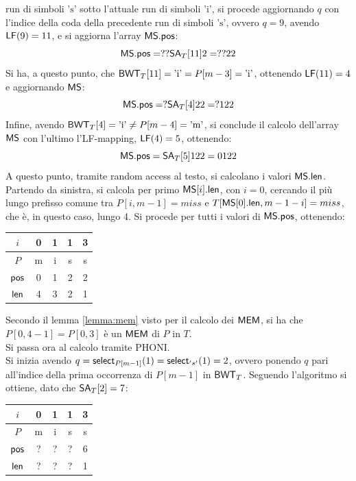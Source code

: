 \begin{esempio}
  run di simboli $\mbox{'s'}$ sotto l'attuale run di simboli $\mbox{'i'}$, si
  procede aggiornando $q$ con l'indice della coda della precedente run di
  simboli $\mbox{'s'}$, ovvero $q=9$, avendo $\mbox{\rm {\sf LF}}(9)=11$, e si aggiorna
  l'array $\mbox{\rm {\sf MS}}.\mbox{\rm {\sf pos}}$:
  \[\mbox{\rm {\sf MS}}.\mbox{\rm {\sf pos}} = ??\mbox{\rm {\sf SA}}_T[11]2=??22\]
  Si ha, a questo punto, che $\mbox{\rm {\sf BWT}}_T[11]=\mbox{'i'}= P[m-3]=\mbox{'i'}$,
  ottenendo $\mbox{\rm {\sf LF}}(11)=4$ e aggiornando $\mbox{\rm {\sf MS}}$:
  \[\mbox{\rm {\sf MS}}.\mbox{\rm {\sf pos}} = ?\mbox{\rm {\sf SA}}_T[4]22=?122\]
  Infine, avendo $\mbox{\rm {\sf BWT}}_T[4]=\mbox{'i'}\neq P[m-4]=\mbox{'m'}$, si conclude il
  calcolo dell'array $\mbox{\rm {\sf MS}}$ con l'ultimo l'LF-mapping, $\mbox{\rm {\sf LF}}(4)=5$,
  ottenendo:
  \[\mbox{\rm {\sf MS}}.\mbox{\rm {\sf pos}} = \mbox{\rm {\sf SA}}_T[5]122=0122\]
  A questo punto, tramite random access al testo, si calcolano i valori
  $\mbox{\rm {\sf MS}}.\mbox{\rm {\sf len}}$. Partendo da sinistra, si calcola per primo $\mbox{\rm {\sf MS}}[i].\mbox{\rm {\sf len}}$, con
  $i=0$, 
  cercando il più lungo prefisso comune tra $P[i,m-1]=miss$ e $T[\mbox{\rm {\sf MS}}[0].\mbox{\rm {\sf len}},
  m-1-i]=miss$, che è, in questo caso, lungo 4. Si procede per tutti i valori di
  $\mbox{\rm {\sf MS}}.\mbox{\rm {\sf pos}}$, ottenendo:
  \begin{table}[H]
    \centering
    \begin{tabular}{c||c|c|c|c}
      $i$ & 0 & 1 & 1 & 3 \\
      \hline
      $P$ & m & i & s & s \\
      \hline
      \hline
      $\mbox{\rm {\sf pos}}$ & 0 & 1 & 2 & 2\\
      \hline
      $\mbox{\rm {\sf len}}$ & 4 & 3 & 2 & 1\\
    \end{tabular}
  \end{table}
  \noindent
  Secondo il lemma \ref{lemma:mem} visto per il calcolo dei $\mbox{\rm {\sf MEM}}$, si ha che
  $P[0,4-1]=P[0,3]$ è un $\mbox{\rm {\sf MEM}}$ di $P$ in $T$.\\
  Si passa ora al calcolo tramite PHONI.\\
  Si inizia avendo $q=\mbox{\rm {\sf select}}_{P[m-1]}(1)=\mbox{\rm {\sf select}}_{'s'}(1)=2$, ovvero ponendo $q$
  pari all'indice della prima occorrenza di $P[m-1]$ in $\mbox{\rm {\sf BWT}}_T$. Seguendo
  l'algoritmo si ottiene, dato che $\mbox{\rm {\sf SA}}_T[2]=7$:
  \begin{table}[H]
    \centering
    \begin{tabular}{c||c|c|c|c}
      $i$ & 0 & 1 & 1 & 3 \\
      \hline
      $P$ & m & i & s & s \\
      \hline
      \hline
      $\mbox{\rm {\sf pos}}$ & ? & ? & ? & 6\\
      \hline
      $\mbox{\rm {\sf len}}$ & ? & ? & ? & 1\\
    \end{tabular}
  \end{table}

\end{esempio}
